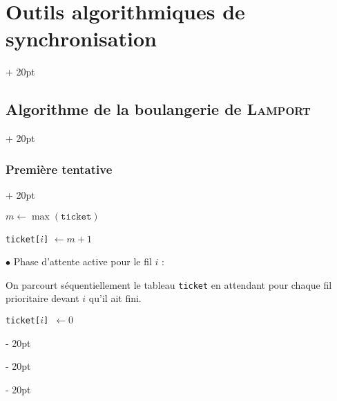\documentclass[a4paper, 12pt, twoside]{article}
\newenvironment{indalgo}[2][H]{
    \begin{minipage}{\linewidth-\leftskip-5pt}
        \begin{algorithm}[#1]
            \caption{#2}
}
{
        \end{algorithm}
    \end{minipage}
}
\newcommand{\ind}[1][20pt]{\advance\leftskip + #1}
\newcommand{\deind}[1][20pt]{\advance\leftskip - #1}
\newenvironment{indt}[2][20pt]{#2 \par \ind[#1]}{\par \deind} %
\begin{document}
\begin{indt}{\section{Outils algorithmiques de synchronisation}}
\begin{indt}{\subsection{Algorithme de la boulangerie de \textsc{Lamport}}}
\begin{indt}{\subsubsection{Première tentative}}
                \begin{emphBox}
                    $m \leftarrow \max(\mathtt{ticket})$

                    \texttt{ticket[$i$]} $\leftarrow m + 1$
                \end{emphBox}

                \vspace{6pt}
                
                $\bullet$ Phase d'attente active pour le fil $i$ :

                On parcourt séquentiellement le tableau \texttt{ticket} en attendant pour chaque fil prioritaire devant $i$ qu'il ait fini.

% 
%                     
% 
    
                \begin{indalgo}{Phase d'attente active pour le fil $i$}

                    \BlankLine


                    \texttt{ticket[$i$] $\gets 0$} \;
                \end{indalgo}

                \vspace{6pt}
                

\end{indt}
\end{indt}
\end{indt}
\end{document}
